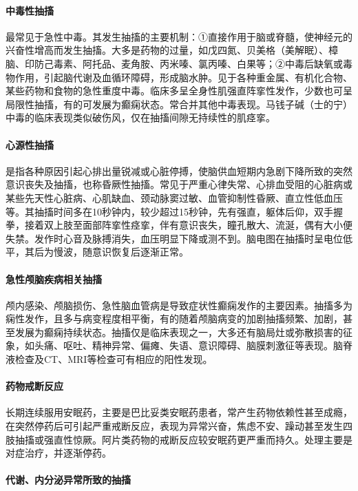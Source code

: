 \paragraph{中毒性抽搐}

最常见于急性中毒。其发生抽搐的主要机制：①直接作用于脑或脊髓，使神经元的兴奋性增高而发生抽搐。大多是药物的过量，如戊四氮、贝美格（美解眠）、樟脑、印防己毒素、阿托品、麦角胺、丙米嗪、氯丙嗪、白果等；②中毒后缺氧或毒物作用，引起脑代谢及血循环障碍，形成脑水肿。见于各种重金属、有机化合物、某些药物和食物的急性重度中毒。临床多呈全身性肌强直阵挛性发作，少数也可呈局限性抽搐，有的可发展为癫痫状态。常合并其他中毒表现。马钱子碱（士的宁）中毒的临床表现类似破伤风，仅在抽搐间隙无持续性的肌痉挛。

\paragraph{心源性抽搐}

是指各种原因引起心排出量锐减或心脏停搏，使脑供血短期内急剧下降所致的突然意识丧失及抽搐，也称昏厥性抽搐。常见于严重心律失常、心排血受阻的心脏病或某些先天性心脏病、心肌缺血、颈动脉窦过敏、血管抑制性昏厥、直立性低血压等。其抽搐时间多在10秒钟内，较少超过15秒钟，先有强直，躯体后仰，双手握拳，接着双上肢至面部阵挛性痉挛，伴有意识丧失，瞳孔散大、流涎，偶有大小便失禁。发作时心音及脉搏消失，血压明显下降或测不到。脑电图在抽搐时呈电位低平，其后为慢波，随意识恢复后逐渐正常。

\paragraph{急性颅脑疾病相关抽搐}

颅内感染、颅脑损伤、急性脑血管病是导致症状性癫痫发作的主要因素。抽搐多为痫性发作，且多与病变程度相平衡，有的随着颅脑病变的加剧抽搐频繁、加剧，甚至发展为癫痫持续状态。抽搐仅是临床表现之一，大多还有脑局灶或弥散损害的征象，如头痛、呕吐、精神异常、偏瘫、失语、意识障碍、脑膜刺激征等表现。脑脊液检查及CT、MRI等检查可有相应的阳性发现。

\paragraph{药物戒断反应}

长期连续服用安眠药，主要是巴比妥类安眠药患者，常产生药物依赖性甚至成瘾，在突然停药后可引起严重戒断反应，表现为异常兴奋，焦虑不安、躁动甚至发生四肢抽搐或强直性惊厥。阿片类药物的戒断反应较安眠药更严重而持久。处理主要是对症治疗，并逐渐停药。

\paragraph{代谢、内分泌异常所致的抽搐}

